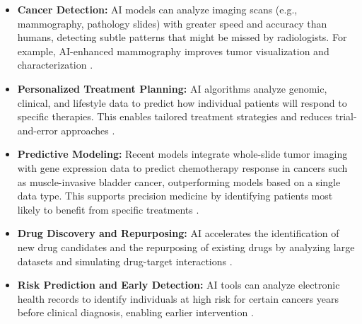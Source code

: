 \begin{itemize}
    \item \textbf{Cancer Detection:} AI models can analyze imaging scans (e.g., mammography, 
    pathology slides) with greater speed and accuracy than humans, detecting subtle patterns that 
    might be missed by radiologists. For example, AI-enhanced mammography improves tumor 
    visualization and characterization \cite{nlmCitingMedicine2007}.
    
    \item \textbf{Personalized Treatment Planning:} AI algorithms analyze genomic, clinical, and 
    lifestyle data to predict how individual patients will respond to specific therapies. This 
    enables tailored treatment strategies and reduces trial-and-error approaches 
    \cite{nlmCitingMedicine2007, radiopharmaceuticals2024}.
    
    \item \textbf{Predictive Modeling:} Recent models integrate whole-slide tumor imaging with gene 
    expression data to predict chemotherapy response in cancers such as muscle-invasive bladder 
    cancer, outperforming models based on a single data type. This supports precision medicine by 
    identifying patients most likely to benefit from specific treatments 
    \cite{radiopharmaceuticals2024}.
    
    \item \textbf{Drug Discovery and Repurposing:} AI accelerates the identification of new drug 
    candidates and the repurposing of existing drugs by analyzing large datasets and simulating 
    drug-target interactions \cite{clinicalTrialsEurope2025}.
    
    \item \textbf{Risk Prediction and Early Detection:} AI tools can analyze electronic health 
    records to identify individuals at high risk for certain cancers years before clinical 
    diagnosis, enabling earlier intervention \cite{nlmCitingMedicine2007}.
\end{itemize}


